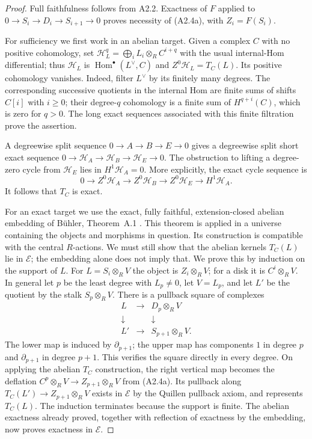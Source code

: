 \begin{proof}
Full faithfulness follows from A2.2.  Exactness of $F$ applied to
$0\to S_i\to D_i\to S_{i+1}\to0$ proves necessity of (A2.4a), with
$Z_i=F(S_i)$.

For sufficiency we first work in an abelian target.  Given a complex
$C$ with no positive cohomology, set
$\mathcal H_L^q=\bigoplus_i L_i\otimes_R C^{i+q}$ with the usual
internal-Hom differential; thus $\mathcal H_L$ is
$\operatorname{Hom}^{\bullet}(L^\vee,C)$ and
$Z^0\mathcal H_L=T_C(L)$.  Its positive cohomology vanishes.  Indeed,
filter $L^\vee$ by its finitely many degrees.  The corresponding
successive quotients in the internal Hom are finite sums of shifts
$C[i]$ with $i\geq0$; their degree-$q$ cohomology is a finite sum of
$H^{q+i}(C)$, which is zero for $q>0$.  The long exact sequences
associated with this finite filtration prove the assertion.

A degreewise split sequence $0\to A\to B\to E\to0$ gives a
degreewise split short exact sequence
$0\to\mathcal H_A\to\mathcal H_B\to\mathcal H_E\to0$.
The obstruction to lifting a degree-zero cycle from $\mathcal H_E$
lies in $H^1\mathcal H_A=0$.  More explicitly, the exact cycle
sequence is
\[
 0\to Z^0\mathcal H_A\to Z^0\mathcal H_B
       \to Z^0\mathcal H_E\to H^1\mathcal H_A.
\]
It follows that $T_C$ is exact.

For an exact target we use the exact, fully faithful,
extension-closed abelian embedding of B\"uhler, Theorem~A.1
\cite{BuehlerExact}.  This theorem is applied in a universe containing
the objects and morphisms in question.  Its construction is compatible
with the central $R$-actions.  We must still show that the abelian
kernels $T_C(L)$ lie in $\mathcal E$; the embedding alone does not
imply that.  We prove this by induction on the support of $L$.
For $L=S_i\otimes_RV$ the object is $Z_i\otimes_RV$; for a disk it
is $C^i\otimes_RV$.  In general let $p$ be the least degree with
$L_p\ne0$, let $V=L_p$, and let $L'$ be the quotient by the stalk
$S_p\otimes_RV$.  There is a pullback square of complexes
\[
 \begin{array}{ccc}
 L&\longrightarrow&D_p\otimes_RV\\
 \downarrow&&\downarrow\\
 L'&\longrightarrow&S_{p+1}\otimes_RV.
 \end{array}
\]
The lower map is induced by $\partial_{p+1}$; the upper map has
components $1$ in degree $p$ and $\partial_{p+1}$ in degree $p+1$.
This verifies the square directly in every degree.  On applying
the abelian $T_C$ construction, the right vertical map becomes the
deflation $C^p\otimes_RV\to Z_{p+1}\otimes_RV$ from (A2.4a).
Its pullback along $T_C(L')\to Z_{p+1}\otimes_RV$ exists in
$\mathcal E$ by the Quillen pullback axiom, and represents $T_C(L)$.
The induction terminates because the support is finite.  The abelian
exactness already proved, together with reflection of exactness by
the embedding, now proves exactness in $\mathcal E$.


\end{proof}
